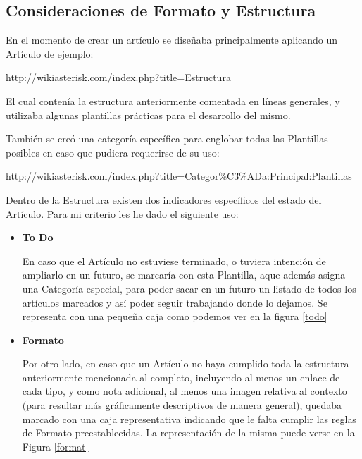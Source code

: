  \subsection{Consideraciones de Formato y Estructura}

 En el momento de crear un artículo se diseñaba principalmente aplicando un Artículo de ejemplo:

 http://wikiasterisk.com/index.php?title=Estructura

 El cual contenía la estructura anteriormente comentada en líneas generales, y utilizaba algunas plantillas prácticas para el desarrollo del mismo.

 También se creó una categoría específica para englobar todas las Plantillas posibles en caso que pudiera requerirse de su uso: 

 http://wikiasterisk.com/index.php?title=Categor\%C3\%ADa:Principal:Plantillas

 Dentro de la Estructura existen dos indicadores específicos del estado del Artículo. Para mi criterio les he dado el siguiente uso:

 \begin{itemize}
	  \setlength{\itemsep}{10pt}

 \item \textbf{To Do}
 
 En caso que el Artículo no estuviese terminado, o tuviera intención de ampliarlo en un futuro, se marcaría con esta Plantilla, aque además asigna una Categoría especial, para poder sacar en un futuro un listado de todos los artículos marcados y así poder seguir trabajando donde lo dejamos. Se representa con una pequeña caja como podemos ver en la figura \ref{todo}


\item \textbf{Formato}

Por otro lado, en caso que un Artículo no haya cumplido toda la estructura anteriormente mencionada al completo, incluyendo al menos un enlace de cada tipo, y como nota adicional, al menos una imagen relativa al contexto (para resultar más gráficamente descriptivos de manera general), quedaba marcado con una caja representativa indicando que le falta cumplir las reglas de Formato preestablecidas. La representación de la misma puede verse en la Figura \ref{format}


\end{itemize}